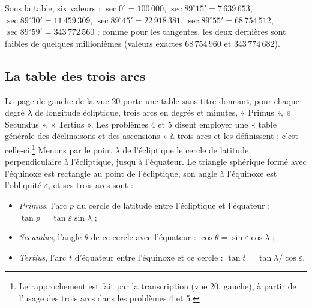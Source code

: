 \documentclass[11pt,a4paper]{article}
\begin{document}
Sous la table, six valeurs : $\sec 0^\circ = 100\,000$, $\sec 89^\circ 15' =
7\,639\,653$, $\sec 89^\circ 30' = 11\,459\,309$, $\sec 89^\circ 45' =
22\,918\,381$, $\sec 89^\circ 55' = 68\,754\,512$, $\sec 89^\circ 59' =
343\,772\,560$ ; comme pour les tangentes, les deux dernières sont faibles de
quelques millionièmes (valeurs exactes $68\,754\,960$ et $343\,774\,682$).

\subsection*{La table des trois arcs}

La page de gauche de la vue 20 porte une table sans titre donnant, pour chaque
degré $\lambda$ de longitude écliptique, trois arcs en degrés et minutes,
« Primus », « Secundus », « Tertius ». Les problèmes 4 et 5 disent employer une
« table générale des déclinaisons et des ascensions » à trois arcs et les
définissent ; c'est celle-ci.\footnote{Le rapprochement est fait par la
transcription (vue 20, gauche), à partir de l'usage des trois arcs dans les
problèmes 4 et 5.} Menons par le point $\lambda$ de l'écliptique le cercle de
latitude, perpendiculaire à l'écliptique, jusqu'à l'équateur. Le triangle
sphérique formé avec l'équinoxe est rectangle au point de l'écliptique, son
angle à l'équinoxe est l'obliquité $\varepsilon$, et ses trois arcs sont :

\begin{itemize}
  \item \emph{Primus}, l'arc $p$ du cercle de latitude entre l'écliptique et
    l'équateur : $\tan p = \tan\varepsilon \sin\lambda$ ;
  \item \emph{Secundus}, l'angle $\theta$ de ce cercle avec l'équateur :
    $\cos\theta = \sin\varepsilon\cos\lambda$ ;
  \item \emph{Tertius}, l'arc $t$ d'équateur entre l'équinoxe et ce cercle :
    $\tan t = \tan\lambda / \cos\varepsilon$.
\end{itemize}
\end{document}
